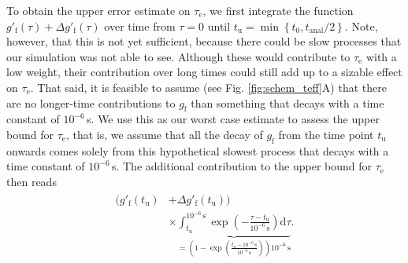 \documentclass[journal=jcisd8,manuscript=article,layout=twocolumn]{achemso}
\begin{document}
To obtain the upper error estimate on $\tau_\mathrm e$, we first integrate the function
$g'_{\mathrm{f}}(\tau) + \Delta g'_{\mathrm{f}}(\tau)$ over time from $\tau=0$ until
$
t_\mathrm u= \min
\left\{
	t_0,
	{t_\mathrm{anal}}/{2}
\right\}.
$
Note, however,
that this is not yet sufficient, because there could be slow processes that our simulation was not
able to see. Although these would contribute to $\tau_\mathrm e$ with a low weight,
their contribution over long times could still add up to a sizable effect on $\tau_\mathrm e$.
%
That said, it is feasible to assume (see Fig. \ref{fig:schem_teff}A) that there are no longer-time contributions
to $g_\mathrm f$ than something that decays with a time constant of $10^{-6}$\,s.
%
We use this as our worst case estimate to assess the upper bound for $\tau_\mathrm e$, that is,
%
we assume that all the decay of $g_\mathrm f$ from the time point
$
t_\mathrm u$ %
onwards comes solely from this hypothetical slowest process that decays with a time constant of $10^{-6}$\,s.
%
The additional contribution to the upper bound for $\tau_\mathrm e$ then reads
\begin{align}
\label{eq:extraUpperError}
\begin{split}
( g'_\mathrm f(t_\mathrm u)&+\Delta g'_\mathrm f(t_\mathrm u) )\\
&\times \underbrace{\int_{t_\mathrm u}^{10^{-6}\,\mathrm s} \exp\left(-\frac{\tau-t_\mathrm u}{10^{-6}\,\mathrm s}\right)\mathrm{d}\tau}_{= \left( 1 - \exp\left( \frac{t_\mathrm u-10^{-6}\,\mathrm s}{10^{-6}\,\mathrm s} \right) \right) 10^{-6}\,\mathrm s}.
\end{split}
\end{align}

\end{document}
